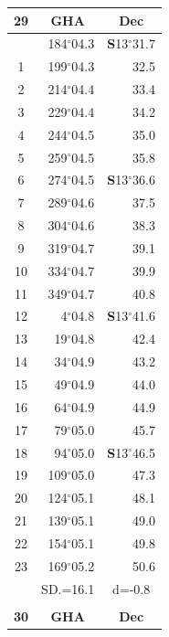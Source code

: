\documentclass[10pt, a4paper]{report}
\begin{document}
\begin{scriptsize}
\noindent
\begin{tabular*}{0.2\textwidth}[t]{@{\extracolsep{\fill}}|c|rr|}
\hline
\multicolumn{1}{|c|}{\rule{0pt}{2.6ex}\textbf{29}} & \multicolumn{1}{c}{\textbf{GHA}} & \multicolumn{1}{c|}{\textbf{Dec}}\\
\hline\rule{0pt}{2.6ex}\noindent
0 & 184$^\circ$04.3 & \textbf{S}13$^\circ$31.7\\
1 & 199$^\circ$04.3 & 32.5\\
2 & 214$^\circ$04.4 & 33.4\\
3 & 229$^\circ$04.4 & \raisebox{0.24ex}{\boldmath$\cdot$~\boldmath$\cdot$~~}34.2\\
4 & 244$^\circ$04.5 & 35.0\\
5 & 259$^\circ$04.5 & 35.8\\[2Pt]
6 & 274$^\circ$04.5 & \textbf{S}13$^\circ$36.6\\
7 & 289$^\circ$04.6 & 37.5\\
8 & 304$^\circ$04.6 & 38.3\\
9 & 319$^\circ$04.7 & \raisebox{0.24ex}{\boldmath$\cdot$~\boldmath$\cdot$~~}39.1\\
10 & 334$^\circ$04.7 & 39.9\\
11 & 349$^\circ$04.7 & 40.8\\[2Pt]
12 & 4$^\circ$04.8 & \textbf{S}13$^\circ$41.6\\
13 & 19$^\circ$04.8 & 42.4\\
14 & 34$^\circ$04.9 & 43.2\\
15 & 49$^\circ$04.9 & \raisebox{0.24ex}{\boldmath$\cdot$~\boldmath$\cdot$~~}44.0\\
16 & 64$^\circ$04.9 & 44.9\\
17 & 79$^\circ$05.0 & 45.7\\[2Pt]
18 & 94$^\circ$05.0 & \textbf{S}13$^\circ$46.5\\
19 & 109$^\circ$05.0 & 47.3\\
20 & 124$^\circ$05.1 & 48.1\\
21 & 139$^\circ$05.1 & \raisebox{0.24ex}{\boldmath$\cdot$~\boldmath$\cdot$~~}49.0\\
22 & 154$^\circ$05.1 & 49.8\\
23 & 169$^\circ$05.2 & 50.6\\
\hline
\rule{0pt}{2.4ex} & \multicolumn{1}{c}{SD.=16.1} & \multicolumn{1}{c|}{d=-0.8}\\
\hline
\multicolumn{1}{c}{}\\[-0.5ex]\hline
\multicolumn{1}{|c|}{\rule{0pt}{2.6ex}\textbf{30}} & \multicolumn{1}{c}{\textbf{GHA}} & \multicolumn{1}{c|}{\textbf{Dec}}\\

\end{tabular*}
\end{scriptsize}
\end{document}
